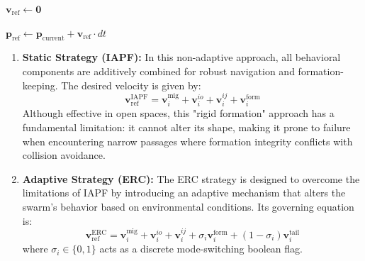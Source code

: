 \documentclass[pdflatex,sn-basic]{sn-jnl}%
\begin{document}
\begin{algorithm}
\begin{algorithmic}[1]
                        \State {}
                            \State $\boldsymbol{v}_{\text{ref}} \gets \boldsymbol{0}$
                        \EndIf
                    \EndIf

                    \State {}
                    \State $\boldsymbol{p}_{\text{ref}} \gets \boldsymbol{p}_{\text{current}} + \boldsymbol{v}_{\text{ref}} \cdot dt$
                \EndFor
            \end{algorithmic}
        \endgroup
        \end{algorithm}

        \begin{enumerate}
            \item \textbf{Static Strategy (IAPF):} In this non-adaptive approach, all behavioral components are additively combined for robust navigation and formation-keeping. The desired velocity is given by:
            \begin{equation}
                \boldsymbol{v}_{\text{ref}}^{\text{IAPF}}=\boldsymbol{v}_{i}^{\text{mig}}+\boldsymbol{v}_{i}^{io}+\boldsymbol{v}_{i}^{ij}+\boldsymbol{v}_{i}^{\text{form}}
            \end{equation}
            Although effective in open spaces, this "rigid formation" approach has a fundamental limitation: it cannot alter its shape, making it prone to failure when encountering narrow passages where formation integrity conflicts with collision avoidance.
            
            \item \textbf{Adaptive Strategy (ERC):} The ERC strategy is designed to overcome the limitations of IAPF by introducing an adaptive mechanism that alters the swarm's behavior based on environmental conditions. Its governing equation is:
            \begin{equation}
                \boldsymbol{v}_{\text{ref}}^{\text{ERC}}=\boldsymbol{v}_{i}^{\text{mig}}+\boldsymbol{v}_{i}^{io}+\boldsymbol{v}_{i}^{ij}+\sigma_{i}\boldsymbol{v}_{i}^{\text{form}}+(1-\sigma_{i})\boldsymbol{v}_{i}^{\text{tail}}
            \end{equation}
            where $\sigma_i \in \{0, 1\}$ acts as a discrete mode-switching boolean flag.
            

\end{enumerate}
\end{document}
